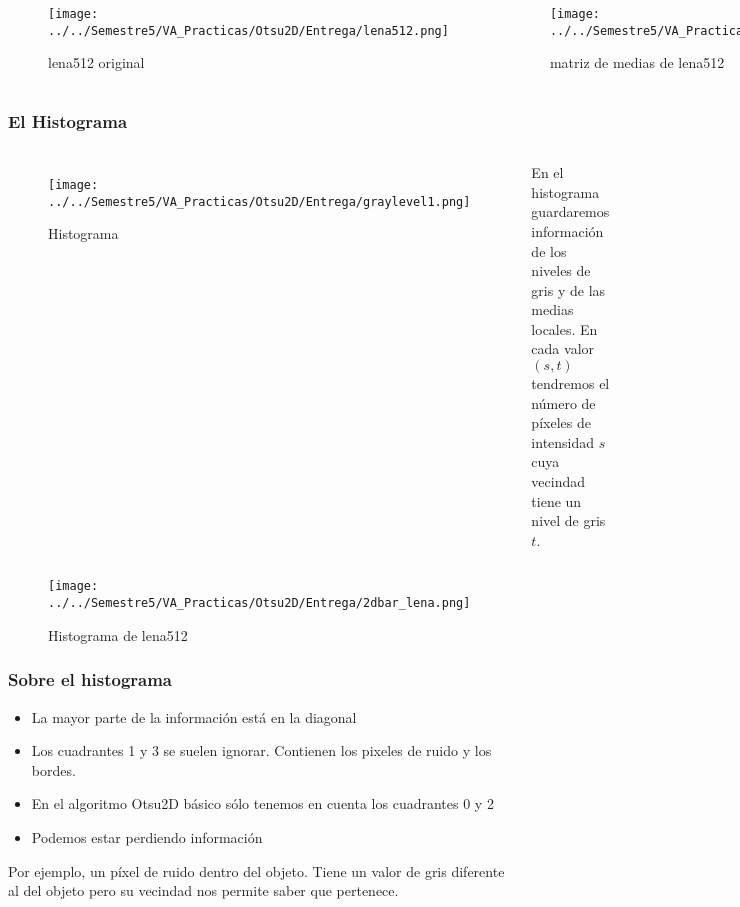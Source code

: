 \documentclass{beamer}
\begin{document}
\begin{frame}
\begin{columns}[t] %
\begin{figure}
\texttt{[image: ../../Semestre5/VA\_Practicas/Otsu2D/Entrega/lena512.png]}
\caption{lena512 original}
\end{figure}

\begin{figure}
\texttt{[image: ../../Semestre5/VA\_Practicas/Otsu2D/Entrega/lena512s.png]}
\caption{matriz de medias de lena512}
\end{figure}

\end{columns}
\end{frame}

\begin{frame}
\frametitle{El Histograma}
\begin{columns}[c] %
\begin{figure}
\texttt{[image: ../../Semestre5/VA\_Practicas/Otsu2D/Entrega/graylevel1.png]}
\caption{Histograma \cite{p1}}
\end{figure}

En el histograma guardaremos información de los niveles de gris y de las medias locales. En cada valor $(s,t)$ tendremos el número de píxeles de intensidad $s$ cuya vecindad tiene un nivel de gris $t$. 

\end{columns}
\end{frame}

\begin{frame}
\begin{figure}
\texttt{[image: ../../Semestre5/VA\_Practicas/Otsu2D/Entrega/2dbar\_lena.png]}
\caption{Histograma de lena512}
\end{figure}
\end{frame}

\begin{frame}
\frametitle{Sobre el histograma}
\begin{itemize}
\item La mayor parte de la información está en la diagonal
\item Los cuadrantes 1 y 3 se suelen ignorar. Contienen los pixeles de ruido y los bordes.
\item En el algoritmo Otsu2D básico sólo tenemos en cuenta los cuadrantes 0 y 2
\item Podemos estar perdiendo información
\end{itemize}
Por ejemplo, un píxel de ruido dentro del objeto. Tiene un valor de gris diferente al del objeto pero su vecindad nos permite saber que pertenece.
\end{frame}
\end{document}
